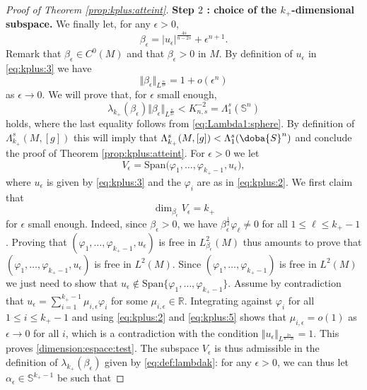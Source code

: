 \documentclass[10pt]{amsart}
\numberwithin{equation}{section}
\newcommand{\R}{\mathbb{R}}
\def\ep{{\varepsilon}}
\gdef\mS{\doba{S}}
\newcommand{\vp}{\varphi}
\def \ep{\epsilon}
\theoremstyle{plain}
\theoremstyle{remark}
\begin{document}
\begin{proof}[Proof of Theorem \ref{prop:kplus:atteint}]
\noindent \textbf{Step $2$ : choice of the $k_+$-dimensional subspace.}
We finally let, for any $\ep >0$,
\begin{equation*}
\beta_\ep = |u_{\ep}|^{\frac{4s}{n-2s}} + \ep^{n+1}.
\end{equation*}
Remark that $\beta_\ep \in C^0(M)$ and that $\beta_\ep >0$ in $M$. By definition of $u_\ep$ in \eqref{eq:kplus:3} we have 
 \begin{equation} \label{norm_beta_ep}
     \Vert \beta_\ep \Vert_{L^{\frac{n}{2s}}} = 1 + o(\ep^n)
 \end{equation} 
as $\ep \to 0$. We will prove that, for $\ep$ small enough,
\begin{equation} \label{eq:kplus:6}
\lambda_{k_+}(\beta_\ep)    \Vert \beta_\ep \Vert_{L^{\frac{n}{2s}}}<  K_{n,s}^{-2} = \Lambda_{1}^s(\mathbb{S}^n)
\end{equation}
holds, where the last equality follows from \eqref{eq:Lambda1:sphere}. By definition of $\Lambda_{k_+}^{s}(M,[g])$ this will imply that $\Lambda_{k_+}^s(M,[g]) < \Lambda_1^s(\mS^n)$ and conclude the proof of Theorem \ref{prop:kplus:atteint}. %
For $\ep >0$ we let 
$$ V_\ep = \text{Span} \big( \vp_{1}, \dots, \vp_{k_+-1}, u_\ep\big), $$
where $u_\ep$ is given by \eqref{eq:kplus:3} and the $\varphi_i$ are as in \eqref{eq:kplus:2}. We first claim that
 \begin{equation} \label{dimension:espace:test}
 \dim_{\beta_\ep} V_\ep = k_+
 \end{equation}  for $\ep$ small enough. Indeed, since $\beta_\ep >0$,  we have $\beta_\ep^{\frac12} \vp_\ell \neq 0$ for all $1 \le \ell \le k_{+}-1$. Proving that $(\vp_1, \dots, \vp_{k_+-1}, u_\ep)$ is free in $L^2_{\beta_\ep}(M)$ thus amounts to prove that $(\vp_1, \dots, \vp_{k_+-1}, u_\ep)$ is free in $L^2(M)$. Since $( \vp_{1}, \dots, \vp_{k_+-1})$ is free in $L^2(M)$ we just need to show that $u_\ep \not \in \text{Span}\big\{ \vp_1, \dots, \vp_{k_+-1}\big\}$. Assume by contradiction that $u_\ep = \sum_{i=1}^{k_+-1}\mu_{i,\ep} \vp_i$ for some $\mu_{i,\ep} \in \R$. Integrating against $\vp_i$ for all $1 \le i \le k_+-1$ and using \eqref{eq:kplus:2} and  \eqref{eq:kplus:5} shows that $\mu_{i,\ep} = o(1)$ as $\ep \to 0$ for all $i$, which is a contradiction with the condition $\Vert u_\ep \Vert_{L^{\frac{2n}{n-2s}}} = 1$. This proves \eqref{dimension:espace:test}. The subspace $V_\ep$ is thus admissible in the definition of $\lambda_{k_+}(\beta_\ep)$ given by \eqref{eq:def:lambdak}: for any $\ep >0$, we can thus let $\alpha_\ep \in \mathbb{S}^{k_+-1}$ be such that 

\end{proof}
\end{document}
